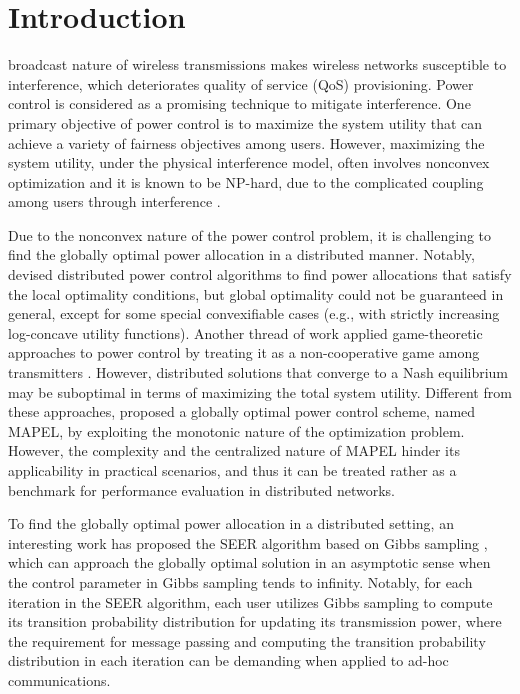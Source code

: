 \documentclass[10pt,journal,letterpaper,compsoc]{IEEEtran}
\begin{document}
\section{Introduction} \label{sec:introduction}
 broadcast nature of wireless transmissions makes wireless networks susceptible to interference, which deteriorates quality of service (QoS) provisioning. Power control is considered as a promising technique to mitigate interference. One primary objective of power control is to maximize the system utility that can achieve a variety of fairness objectives among users\cite{chiang:2008,julian:2002,chiang:2007,xiao:2003}.
However, maximizing the system utility, under the physical interference model, often involves nonconvex optimization and it is known to be NP-hard, due to the complicated coupling among users through interference \cite{luo:2008}.

Due to the nonconvex nature of the power control problem, it is challenging to find the globally optimal power allocation in a distributed manner. Notably, \cite{hande:2008,huang:2006} devised distributed power control algorithms to find power allocations that satisfy the local optimality conditions, but global optimality could not be guaranteed in general, except for some special convexifiable  cases (e.g., with strictly increasing log-concave utility functions). Another thread of work applied game-theoretic approaches to power control by treating it as a non-cooperative game among transmitters \cite{saraydar:2002,alpcan:2002}. However, distributed solutions that converge to a Nash equilibrium may be suboptimal in terms of maximizing the total system utility. Different from these approaches, \cite{qian:2009} proposed a globally optimal power control scheme, named MAPEL, by exploiting the monotonic nature of the optimization problem. However, the complexity and the centralized nature of MAPEL hinder its applicability in practical scenarios, and thus it can be treated rather as a benchmark for performance evaluation in distributed networks.

To find the globally optimal power allocation in a distributed setting, an interesting work \cite{qian:2010} has proposed the SEER algorithm based on Gibbs sampling \cite{geman:1984}, which can approach the globally optimal solution in an asymptotic sense when the control parameter in Gibbs sampling tends to infinity. Notably, for each iteration in the SEER algorithm, each user utilizes Gibbs sampling to compute its transition probability distribution for updating its transmission power, where the requirement for message passing and computing the transition probability distribution in each iteration can be demanding when applied to ad-hoc communications.
\end{document}
